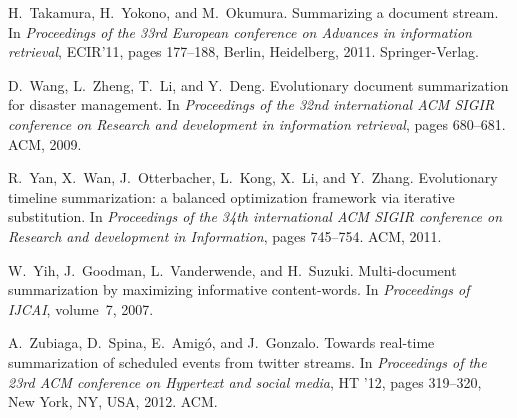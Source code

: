 \documentclass{llncs}
\begin{document}
\begin{thebibliography}{10}
H.~Takamura, H.~Yokono, and M.~Okumura.
\newblock Summarizing a document stream.
\newblock In {\em Proceedings of the 33rd European conference on Advances in
  information retrieval}, ECIR'11, pages 177--188, Berlin, Heidelberg, 2011.
  Springer-Verlag.

D.~Wang, L.~Zheng, T.~Li, and Y.~Deng.
\newblock Evolutionary document summarization for disaster management.
\newblock In {\em Proceedings of the 32nd international ACM SIGIR conference on
  Research and development in information retrieval}, pages 680--681. ACM,
  2009.

R.~Yan, X.~Wan, J.~Otterbacher, L.~Kong, X.~Li, and Y.~Zhang.
\newblock Evolutionary timeline summarization: a balanced optimization
  framework via iterative substitution.
\newblock In {\em Proceedings of the 34th international ACM SIGIR conference on
  Research and development in Information}, pages 745--754. ACM, 2011.

W.~Yih, J.~Goodman, L.~Vanderwende, and H.~Suzuki.
\newblock Multi-document summarization by maximizing informative content-words.
\newblock In {\em Proceedings of IJCAI}, volume~7, 2007.

A.~Zubiaga, D.~Spina, E.~Amig\'{o}, and J.~Gonzalo.
\newblock Towards real-time summarization of scheduled events from twitter
  streams.
\newblock In {\em Proceedings of the 23rd ACM conference on Hypertext and
  social media}, HT '12, pages 319--320, New York, NY, USA, 2012. ACM.

\end{thebibliography}
\end{document}
